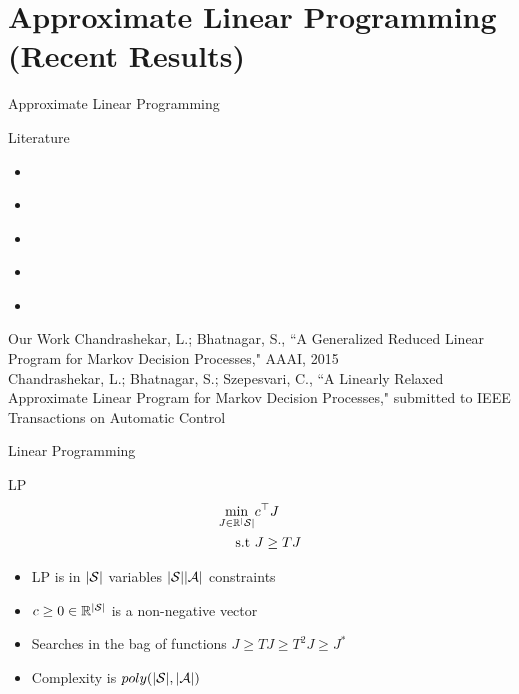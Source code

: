 \documentclass[10pt,handout]{beamer}
\begin{document}
\section{Approximate Linear Programming (Recent Results)}

\begin{frame}[fragile]{Approximate Linear Programming}
\begin{block}{Literature}
\begin{itemize}
\item \cite{schweitzer1985generalized}
\item \cite{de2003linear}
\item \cite{de2004constraint}
\item \cite{desai2009smoothed}
\item \cite{petrik2010feature}
\end{itemize}
\end{block}

\begin{block}{Our Work}
Chandrashekar, L.; Bhatnagar, S., ``A Generalized Reduced Linear Program for Markov Decision Processes," AAAI, 2015\\
Chandrashekar, L.; Bhatnagar, S.; Szepesvari, C., ``A Linearly Relaxed Approximate Linear Program for Markov Decision Processes," submitted to IEEE Transactions on Automatic Control
\end{block}
\end{frame}
\begin{frame}[fragile]{Linear Programming}
\begin{block}{LP \cite{BertB}}
\begin{align*}
\min_{J\in \R^|\S|} &c^\top J\\
\text{s.t}\mb &J\geq T J
\end{align*}
\end{block}

\begin{itemize}
\item LP is in $|\S|$ variables $|\S||\A|$ constraints
\item $c\geq 0 \in \R^{|\S|}$ is a non-negative vector
\item Searches in the bag of {\color{orange}{superharmonic}} functions $J\geq TJ\geq T^2J\geq J^*$
\item Complexity is $poly(|\S|,|\A|)$
\end{itemize}
\end{frame}
\end{document}
